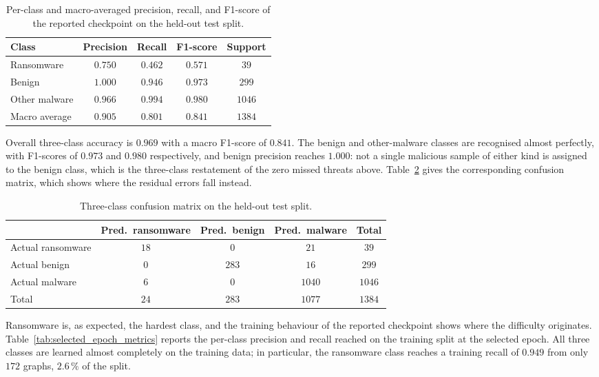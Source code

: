 \documentclass[%
    BCOR=10mm,
    DIV=13,
    toc=bibliography,
    toc=listof,
    oneside,
    12pt,
]{scrbook}
\begin{document}
\begin{table}[H]
\centering
\small
\caption[Per-class and macro-averaged test metrics]{Per-class and macro-averaged precision, recall, and F1-score of the
reported checkpoint on the held-out test split.}
\label{tab:threeclass_metrics}
\begin{tabular}{l ccc c}
\toprule
\textbf{Class} & \textbf{Precision} & \textbf{Recall} & \textbf{F1-score} & \textbf{Support} \\
\midrule
Ransomware     & $0.750$ & $0.462$ & $0.571$ & $39$   \\
Benign         & $1.000$ & $0.946$ & $0.973$ & $299$  \\
Other malware  & $0.966$ & $0.994$ & $0.980$ & $1046$ \\
\midrule
Macro average  & $0.905$ & $0.801$ & $0.841$ & $1384$ \\
\bottomrule
\end{tabular}
\end{table}

Overall three-class accuracy is $0.969$ with a macro F1-score of $0.841$. The
benign and other-malware classes are recognised almost perfectly, with
F1-scores of $0.973$ and $0.980$ respectively, and benign precision reaches
$1.000$: not a single malicious sample of either kind is assigned to the benign
class, which is the three-class restatement of the zero missed threats above.
Table~\ref{tab:threeclass_confusion} gives the corresponding confusion matrix,
which shows where the residual errors fall instead.

\begin{table}[H]
\centering
\small
\caption{Three-class confusion matrix on the held-out test split.}
\label{tab:threeclass_confusion}
\begin{tabular}{l ccc c}
\toprule
 & \textbf{Pred.\ ransomware} & \textbf{Pred.\ benign} & \textbf{Pred.\ malware} & \textbf{Total} \\
\midrule
Actual ransomware & $18$ & $0$   & $21$   & $39$   \\
Actual benign     & $0$  & $283$ & $16$   & $299$  \\
Actual malware    & $6$  & $0$   & $1040$ & $1046$ \\
\midrule
Total             & $24$ & $283$ & $1077$ & $1384$ \\
\bottomrule
\end{tabular}
\end{table}

Ransomware is, as expected, the hardest class, and the training behaviour of
the reported checkpoint shows where the difficulty originates.
Table~\ref{tab:selected_epoch_metrics} reports the per-class precision and
recall reached on the training split at the selected epoch. All three classes
are learned almost completely on the training data; in particular, the
ransomware class reaches a training recall of $0.949$ from only $172$ graphs,
$2.6\,\%$ of the split.
\end{document}
